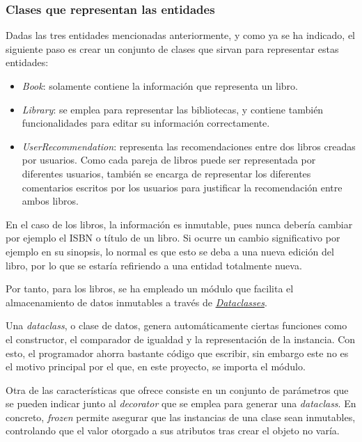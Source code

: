 \subsubsection{Clases que representan las entidades}

Dadas las tres entidades mencionadas anteriormente, y como ya se ha indicado, el siguiente paso es crear un conjunto de clases que sirvan para representar estas entidades:

\begin{itemize}
    \item \textit{Book}: solamente contiene la información que representa un libro.
    \item \textit{Library}: se emplea para representar las bibliotecas, y contiene también funcionalidades para editar su información correctamente.
    \item \textit{UserRecommendation}: representa las recomendaciones entre dos libros creadas por usuarios. Como cada pareja de libros puede ser representada por diferentes usuarios, también se encarga de representar los diferentes comentarios escritos por los usuarios para justificar la recomendación entre ambos libros.
\end{itemize}

En el caso de los libros, la información es inmutable, pues nunca debería cambiar por ejemplo el ISBN o título de un libro. Si ocurre un cambio significativo por ejemplo en su sinopsis, lo normal es que esto se deba a una nueva edición del libro, por lo que se estaría refiriendo a una entidad totalmente nueva.

Por tanto, para los libros, se ha empleado un módulo que facilita el almacenamiento de datos inmutables a través de \href{https://docs.python.org/3/library/dataclasses.html}{\textit{Dataclasses}}.

Una \textit{dataclass}, o clase de datos, genera automáticamente ciertas funciones como el constructor, el comparador de igualdad y la representación de la instancia. Con esto, el programador ahorra bastante código que escribir, sin embargo este no es el motivo principal por el que, en este proyecto, se importa el módulo.

Otra de las características que ofrece consiste en un conjunto de parámetros que se pueden indicar junto al \textit{decorator} que se emplea para generar una \textit{dataclass}. En concreto, \textit{frozen} permite asegurar que las instancias de una clase sean inmutables, controlando que el valor otorgado a sus atributos tras crear el objeto no varía.


